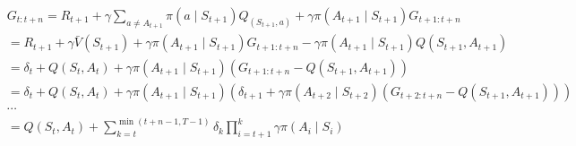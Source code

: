 \begin{align*}
    &G_{t:t+n} = R_{t+1} + \gamma \sum_{a \neq A_{t+1}} \pi(a \mid S_{t+1}) Q_(S_{t+1}, a) 
    + \gamma \pi(A_{t+1} \mid S_{t+1}) G_{t+1:t+n} \\
    &= R_{t+1} + \gamma \bar{V}(S_{t+1}) + \gamma \pi(A_{t+1} \mid S_{t+1}) G_{t+1:t+n} 
    - \gamma \pi(A_{t+1} \mid S_{t+1}) Q(S_{t+1}, A_{t+1}) \\
    &= \delta_t + Q(S_t, A_t)  + \gamma \pi(A_{t+1} \mid S_{t+1}) \left(G_{t+1:t+n} - Q(S_{t+1}, A_{t+1}) \right) \\
    &= \delta_t + Q(S_t, A_t)  + \gamma \pi(A_{t+1} \mid S_{t+1}) \left(\delta_{t+1}  + \gamma \pi(A_{t+2} \mid S_{t+2}) \left(G_{t+2:t+n} - Q(S_{t+1}, A_{t+1}) \right) \right)\\
    &\cdots \\
    &= Q(S_t, A_t) + \sum_{k=t}^{\min(t+n-1, T-1)} \delta_k \prod_{i=t+1}^k \gamma \pi(A_i \mid S_i)
\end{align*}
